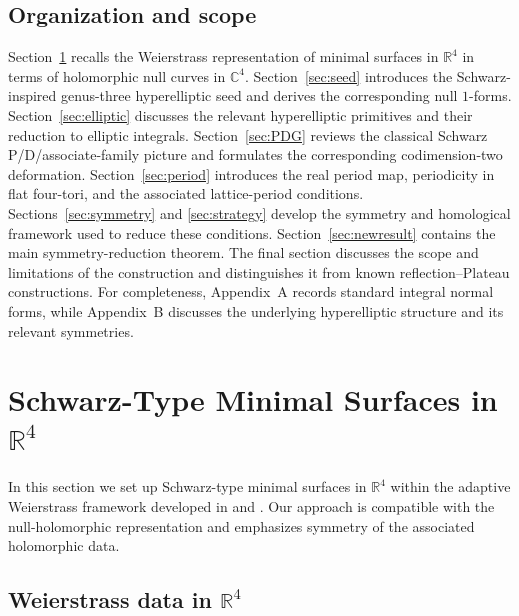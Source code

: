 \documentclass[12pt]{article}
\numberwithin{equation}{section}
\theoremstyle{definition}
\theoremstyle{remark}
\begin{document}
\subsection*{Organization and scope}

Section~\ref{sec:R4WE} recalls the Weierstrass representation of
minimal surfaces in $\mathbb{R}^4$ in terms of holomorphic null curves
in $\mathbb{C}^4$.
Section~\ref{sec:seed} introduces the Schwarz-inspired genus-three
hyperelliptic seed and derives the corresponding null $1$-forms.
Section~\ref{sec:elliptic} discusses the relevant hyperelliptic
primitives and their reduction to elliptic integrals.
Section~\ref{sec:PDG} reviews the classical Schwarz P/D/associate-family
picture and formulates the corresponding codimension-two deformation.
Section~\ref{sec:period} introduces the real period map, periodicity in
flat four-tori, and the associated lattice-period conditions.
Sections~\ref{sec:symmetry} and \ref{sec:strategy} develop the symmetry
and homological framework used to reduce these conditions.
Section~\ref{sec:newresult} contains the main symmetry-reduction
theorem. The final section discusses the scope and limitations of the
construction and distinguishes it from known reflection--Plateau
constructions. For completeness, Appendix~A records standard integral
normal forms, while Appendix~B discusses the underlying hyperelliptic
structure and its relevant symmetries.


\section{Schwarz-Type Minimal Surfaces in $\mathbb{R}^4$}\label{sec:R4WE}

In this section we set up Schwarz-type minimal surfaces in $\mathbb{R}^4$
within the adaptive Weierstrass framework developed in \cite{TodaGulerRn} and \cite{TodaGulerR4}.
Our approach is compatible with the null-holomorphic representation and emphasizes symmetry of the associated holomorphic data.


\subsection{Weierstrass data in $\mathbb{R}^4$}
\end{document}
